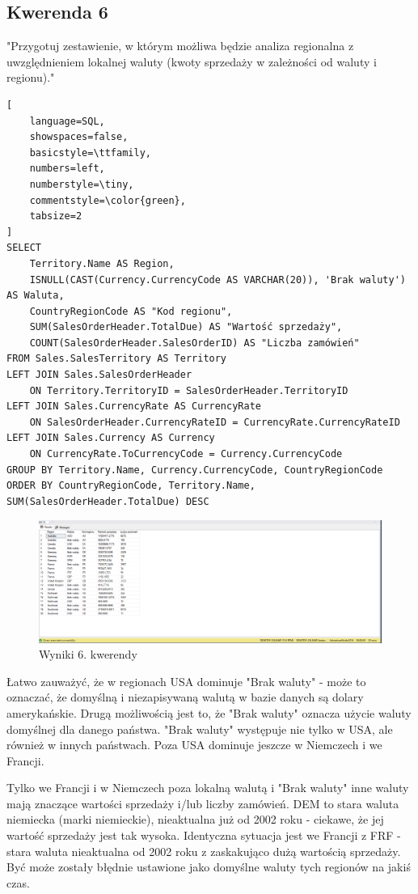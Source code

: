 \documentclass[a4paper,12pt]{article}
\begin{document}
\subsection{Kwerenda 6}

"Przygotuj zestawienie, w którym możliwa będzie analiza regionalna z uwzględnieniem lokalnej waluty (kwoty sprzedaży w zależności od waluty i regionu)."

{\small
\begin{lstlisting}[
	language=SQL,
	showspaces=false,
	basicstyle=\ttfamily,
	numbers=left,
	numberstyle=\tiny,
	commentstyle=\color{green},
	tabsize=2
]
SELECT 
	Territory.Name AS Region,
	ISNULL(CAST(Currency.CurrencyCode AS VARCHAR(20)), 'Brak waluty') AS Waluta,
	CountryRegionCode AS "Kod regionu",
	SUM(SalesOrderHeader.TotalDue) AS "Wartość sprzedaży",
	COUNT(SalesOrderHeader.SalesOrderID) AS "Liczba zamówień"
FROM Sales.SalesTerritory AS Territory
LEFT JOIN Sales.SalesOrderHeader 
	ON Territory.TerritoryID = SalesOrderHeader.TerritoryID
LEFT JOIN Sales.CurrencyRate AS CurrencyRate
	ON SalesOrderHeader.CurrencyRateID = CurrencyRate.CurrencyRateID
LEFT JOIN Sales.Currency AS Currency
	ON CurrencyRate.ToCurrencyCode = Currency.CurrencyCode
GROUP BY Territory.Name, Currency.CurrencyCode, CountryRegionCode
ORDER BY CountryRegionCode, Territory.Name, SUM(SalesOrderHeader.TotalDue) DESC
\end{lstlisting}}

\begin{figure}[H]
	\centering
	\includegraphics[width=1.0\textwidth]{images/6.png}
	\caption{Wyniki 6. kwerendy}
\end{figure}

Łatwo zauważyć, że w regionach USA dominuje "Brak waluty" - może to oznaczać, że domyślną i niezapisywaną walutą w bazie danych są dolary amerykańskie. Drugą możliwością jest to, że "Brak waluty" oznacza użycie waluty domyślnej dla danego państwa. "Brak waluty" występuje nie tylko w USA, ale również w innych państwach. Poza USA dominuje jeszcze w Niemczech i we Francji.

Tylko we Francji i w Niemczech poza lokalną walutą i "Brak waluty" inne waluty mają znaczące wartości sprzedaży i/lub liczby zamówień. DEM to stara waluta niemiecka (marki niemieckie), nieaktualna już od 2002 roku - ciekawe, że jej wartość sprzedaży jest tak wysoka. Identyczna sytuacja jest we Francji z FRF - stara waluta nieaktualna od 2002 roku z zaskakująco dużą wartością sprzedaży. Być może zostały błędnie ustawione jako domyślne waluty tych regionów na jakiś czas.
\end{document}
